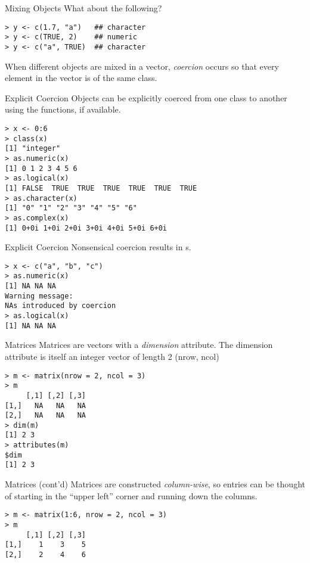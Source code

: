 \documentclass[aspectratio=169]{beamer}
\begin{document}
\begin{frame}[fragile]{Mixing Objects}
What about the following?
\begin{verbatim}
> y <- c(1.7, "a")   ## character
> y <- c(TRUE, 2)    ## numeric
> y <- c("a", TRUE)  ## character
\end{verbatim}
When different objects are mixed in a vector, \textit{coercion} occurs
so that every element in the vector is of the same class.
\end{frame}

\begin{frame}[fragile]{Explicit Coercion}
Objects can be explicitly coerced from one class to another using the
 functions, if available.
\begin{verbatim}
> x <- 0:6
> class(x)
[1] "integer"
> as.numeric(x)
[1] 0 1 2 3 4 5 6
> as.logical(x)
[1] FALSE  TRUE  TRUE  TRUE  TRUE  TRUE  TRUE
> as.character(x)
[1] "0" "1" "2" "3" "4" "5" "6"
> as.complex(x)
[1] 0+0i 1+0i 2+0i 3+0i 4+0i 5+0i 6+0i
\end{verbatim}
\end{frame}

\begin{frame}[fragile]{Explicit Coercion}
Nonsensical coercion results in s.
\begin{verbatim}
> x <- c("a", "b", "c")
> as.numeric(x)
[1] NA NA NA
Warning message:
NAs introduced by coercion 
> as.logical(x)
[1] NA NA NA
\end{verbatim}
\end{frame}


\begin{frame}[fragile]{Matrices}
Matrices are vectors with a \textit{dimension} attribute.  The
dimension attribute is itself an integer vector of length 2 (nrow,
ncol)
\begin{verbatim}
> m <- matrix(nrow = 2, ncol = 3)
> m
     [,1] [,2] [,3]
[1,]   NA   NA   NA
[2,]   NA   NA   NA
> dim(m)
[1] 2 3
> attributes(m)
$dim
[1] 2 3
\end{verbatim}
\end{frame}

\begin{frame}[fragile]{Matrices (cont'd)}
Matrices are constructed \textit{column-wise}, so entries can be
thought of starting in the ``upper left'' corner and running down the
columns.
\begin{verbatim}
> m <- matrix(1:6, nrow = 2, ncol = 3)
> m
     [,1] [,2] [,3]
[1,]    1    3    5
[2,]    2    4    6
\end{verbatim}
\end{frame}
\end{document}
